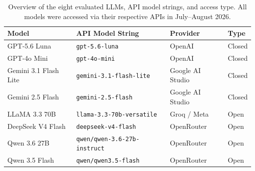 \documentclass[runningheads]{llncs}
\begin{document}
\begin{table}[t]
\caption{Overview of the eight evaluated LLMs, API model strings, and access type. All models were accessed via their respective APIs in July--August 2026.}\label{tab:models}
\centering
\small
\begin{tabular}{p{2.8cm}p{3.0cm}ll}
\toprule
\textbf{Model} & \textbf{API Model String} & \textbf{Provider} & \textbf{Type} \\
\midrule
GPT-5.6 Luna & \texttt{gpt-5.6-luna} & OpenAI & Closed \\
GPT-4o Mini & \texttt{gpt-4o-mini} & OpenAI & Closed \\
Gemini 3.1 Flash Lite & \texttt{gemini-3.1-flash-lite} & Google AI Studio & Closed \\
Gemini 2.5 Flash & \texttt{gemini-2.5-flash} & Google AI Studio & Closed \\
LLaMA 3.3 70B & \texttt{llama-3.3-70b-versatile} & Groq / Meta & Open \\
DeepSeek V4 Flash & \texttt{deepseek-v4-flash} & OpenRouter & Open \\
Qwen 3.6 27B & \texttt{qwen/qwen-3.6-27b-instruct} & OpenRouter & Open \\
Qwen 3.5 Flash & \texttt{qwen/qwen3.5-flash} & OpenRouter & Open \\
\bottomrule
\end{tabular}
\end{table}
\end{document}
